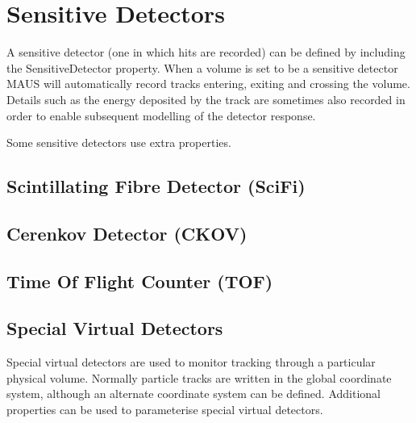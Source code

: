 \section{Sensitive Detectors}
A sensitive detector (one in which hits are recorded) can be defined by including the SensitiveDetector property. When a
volume is set to be a sensitive detector MAUS will automatically record tracks entering, exiting and crossing the
volume. Details such as the energy deposited by the track are sometimes also recorded in order to enable subsequent
modelling of the detector response.

Some sensitive detectors use extra properties.

\subsection[Scintillating Fibre Detector (SciFi)]{Scintillating Fibre Detector (SciFi)}
\subsection{Cerenkov Detector (CKOV)}
\subsection{Time Of Flight Counter (TOF)}
\subsection{Special Virtual Detectors}
Special virtual detectors are used to monitor tracking through a particular physical volume. Normally particle tracks
are written in the global coordinate system, although an alternate coordinate system can be defined. Additional
properties can be used to parameterise special virtual detectors.

